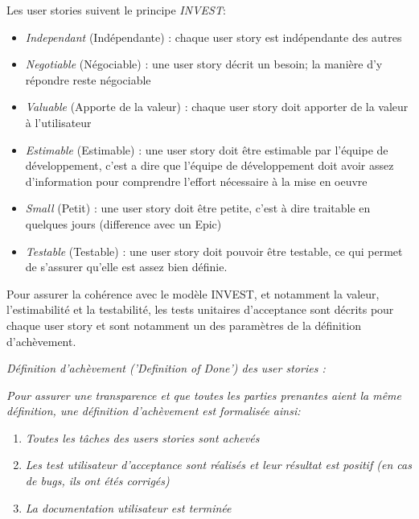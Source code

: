 \bigskip

Les user stories suivent le principe \emph{INVEST}:
\begin{itemize}
      \item \emph{Independant} (Indépendante) : chaque user story est indépendante des autres
      \item \emph{Negotiable} (Négociable) : une user story décrit un besoin; la manière d’y répondre reste 
      négociable
      \item \emph{Valuable} (Apporte de la valeur) : chaque user story doit apporter de la valeur à l'utilisateur
      \item \emph{Estimable} (Estimable) : une user story doit être estimable par l'équipe de développement, 
      c’est a dire que l'équipe de développement doit avoir assez d’information pour comprendre l’effort nécessaire à la mise en oeuvre
      \item \emph{Small} (Petit) : une user story doit être petite, c’est à dire traitable en quelques jours 
      (difference avec un Epic)
      \item \emph{Testable} (Testable) : une user story doit pouvoir être testable, ce qui permet de s’assurer 
      qu’elle est assez bien définie. 
\end{itemize}

Pour assurer la cohérence avec le modèle INVEST, et notamment la valeur, l’estimabilité et la testabilité, 
les tests unitaires d’acceptance sont décrits pour chaque user story et sont notamment un des paramètres 
de la définition d'achèvement.\\

\noindent%
\hfill%
\begin{minipage}{12cm}
      \textsl{\label{DefofDoneUS}Définition d'achèvement ('Definition of Done') des user stories :}

      \textsl{Pour assurer une transparence et que toutes les parties prenantes aient la même définition, 
une définition d'achèvement est formalisée ainsi:}
\begin{enumerate}     
      \item  \textsl{Toutes les tâches des users stories sont achevés}
      \item  \textsl{Les test utilisateur d’acceptance sont réalisés et leur résultat est positif 
      (en cas de bugs, ils ont étés corrigés)}
      \item  \textsl{La documentation utilisateur est terminée}\\
\end{enumerate}
\end{minipage}


